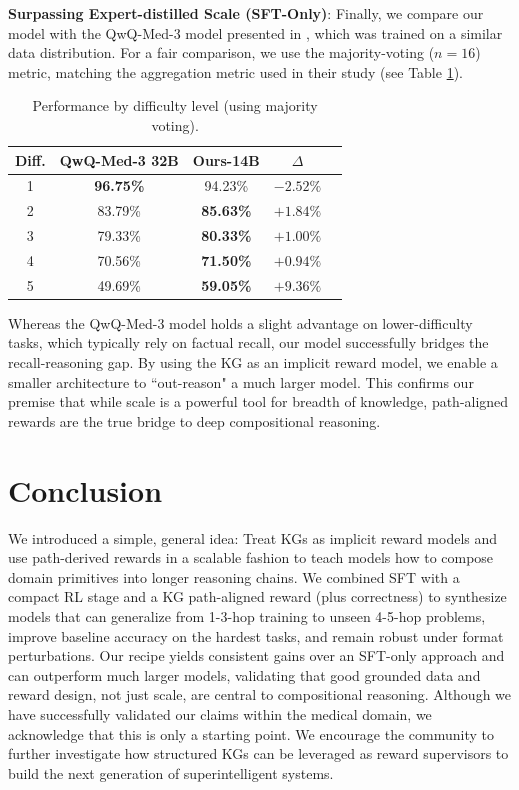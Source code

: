 \documentclass{article}
\theoremstyle{plain}
\theoremstyle{definition}
\theoremstyle{remark}
\begin{document}
\textbf{Surpassing Expert-distilled Scale (SFT-Only)}: Finally, we compare our model with the QwQ-Med-3 model presented in \cite{Dedhia2025Bottom-upNeed}, which was trained on a similar data distribution. For a fair comparison, we use the majority-voting ($n=16$) metric, matching the aggregation metric used in their study (see Table \ref{tab:difficulty}).

\begin{table}[ht]
\caption{Performance by difficulty level (using majority voting).}
\label{tab:difficulty}
\vskip 0.15in
\begin{center}
\begin{small}
\begin{sc}
\begin{tabular}{ccccc}
\toprule
Diff. & QwQ-Med-3 32B & Ours-14B & $\Delta$ \\
\midrule
1 & \textbf{96.75\%} & 94.23\% & $-2.52\%$ \\
2 & 83.79\% & \textbf{85.63\%} & $+1.84\%$ \\
3 & 79.33\% & \textbf{80.33\%} & $+1.00\%$ \\
4 & 70.56\% & \textbf{71.50\%} & $+0.94\%$ \\
5 & 49.69\% & \textbf{59.05\%} & $+9.36\%$ \\
\bottomrule
\end{tabular}
\end{sc}
\end{small}
\end{center}
\vskip -0.1in
\end{table}

Whereas the QwQ-Med-3 model holds a slight advantage on lower-difficulty tasks, which typically rely on factual recall, our model successfully bridges the recall-reasoning gap. By using the KG as an implicit reward model, we enable a smaller architecture to ``out-reason" a much larger model. This confirms our premise that while scale is a powerful tool for breadth of knowledge, path-aligned rewards are the true bridge to deep compositional reasoning.

\section{Conclusion}
We introduced a simple, general idea: Treat KGs as implicit reward models and use path-derived rewards in a scalable fashion to teach models how to compose domain primitives into longer reasoning chains. We combined SFT with a compact RL stage and a KG path-aligned reward (plus correctness) to synthesize models that can generalize from 1-3-hop training to unseen 4-5-hop problems, improve baseline accuracy on the hardest tasks, and remain robust under format perturbations. Our recipe yields consistent gains over an SFT-only approach and can outperform much larger models, validating that good grounded data and reward design, not just scale, are central to compositional reasoning. Although we have successfully validated our claims within the medical domain, we acknowledge that this is only a starting point. We encourage the community to further investigate how structured KGs can be leveraged as reward supervisors to build the next generation of superintelligent systems.
\end{document}
